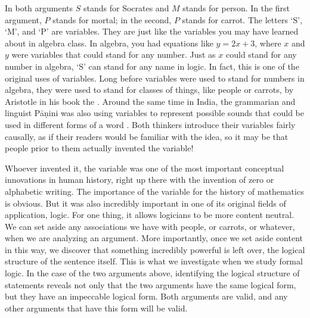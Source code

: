 \begin{kormanize}
\end{kormanize}

In both arguments $S$ stands for Socrates and $M$ stands for person. In the first argument, $P$ stands for mortal; in the second, $P$ stands for carrot. The letters `S', `M', and `P' are variables. They are just like the variables you may have learned about in algebra class. In algebra, you had equations like $y = 2x + 3$, where $x$ and $y$ were variables that could stand for any number. Just as $x$ could stand for any number in algebra, `S' can stand for any name in logic. In fact, this is one of the original uses of variables. Long before variables were used to stand for numbers in algebra, they were used to stand for classes of things, like people or carrots, by Aristotle in his book the \citep{aristotleprioranalytics}. Around the same time in India, the grammarian and linguist P\={a}\d{n}ini was also using variables to represent possible sounds that could be used in different forms of a word \citep{panini2015}. Both thinkers introduce their variables fairly causally, as if their readers would be familiar with the idea, so it may be that people prior to them actually invented the variable!

Whoever invented it, the variable was one of the most important conceptual innovations in human history, right up there with the invention of zero or alphabetic writing. The importance of the variable for the history of mathematics is obvious. But it was also incredibly important in one of its original fields of application, logic. For one thing, it allows logicians to be more content neutral. We can set aside any associations we have with people, or carrots, or whatever, when we are analyzing an argument. More importantly, once we set aside content in this way, we discover that something incredibly powerful is left over, the logical structure of the sentence itself. This is what we investigate when we study formal logic. In the case of the two arguments above, identifying the logical structure of statements reveals not only that the two arguments have the same logical form, but they have an impeccable logical form. Both arguments are valid, and any other arguments that have this form will be valid.

